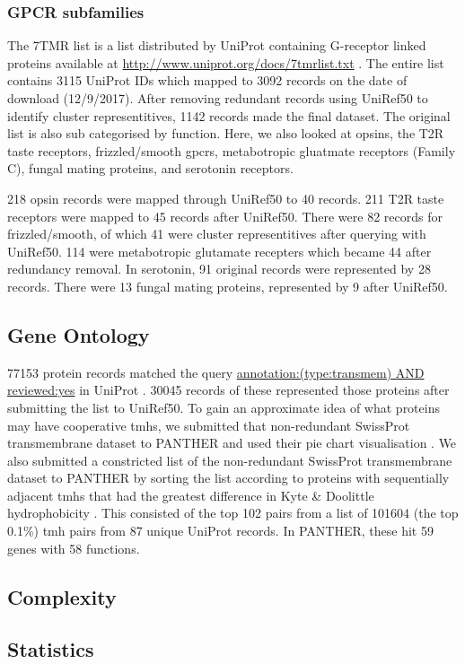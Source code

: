 \subsubsection{GPCR subfamilies}
The 7TMR list is a list distributed by UniProt containing G-receptor linked proteins available at \url{http://www.uniprot.org/docs/7tmrlist.txt} \cite{TheUniProtConsortium2014}.
The entire list contains 3115 UniProt IDs which mapped to 3092 records on the date of download (12/9/2017).
After removing redundant records using UniRef50 to identify cluster representitives, 1142 records made the final dataset.
The original list is also sub categorised by function.
Here, we also looked at opsins, the T2R taste receptors, frizzled/smooth \gls{gpcr}s, metabotropic gluatmate receptors (Family C), fungal mating proteins, and serotonin receptors.

218 opsin records were mapped through UniRef50 to 40 records.
211 T2R taste receptors were mapped to 45 records after UniRef50.
There were 82 records for frizzled/smooth, of which 41 were cluster representitives after querying with UniRef50.
114 were metabotropic glutamate recepters which became 44 after redundancy removal.
In serotonin, 91 original records were represented by 28 records.
There were 13 fungal mating proteins, represented by 9 after UniRef50.



\subsection{Gene Ontology}
77153 protein records matched the query \url{annotation:(type:transmem) AND reviewed:yes} in UniProt \cite{TheUniProtConsortium2014}.
30045 records of these represented those proteins after submitting the list to UniRef50.
To gain an approximate idea of what proteins may have cooperative \gls{tmh}s, we submitted that non-redundant SwissProt transmembrane dataset to PANTHER and used their pie chart visualisation \cite{Mi2017}.
We also submitted a constricted list of the non-redundant SwissProt transmembrane dataset to PANTHER by sorting the list according to proteins with sequentially adjacent \gls{tmh}s that had the greatest difference in Kyte \& Doolittle hydrophobicity \cite{Kyte1982}.
This consisted of the top 102 pairs from a list of 101604 (the top 0.1\%) \gls{tmh} pairs from 87 unique UniProt records.
In PANTHER, these hit 59 genes with 58 functions.

\subsection{Complexity}

\subsection{Statistics}
